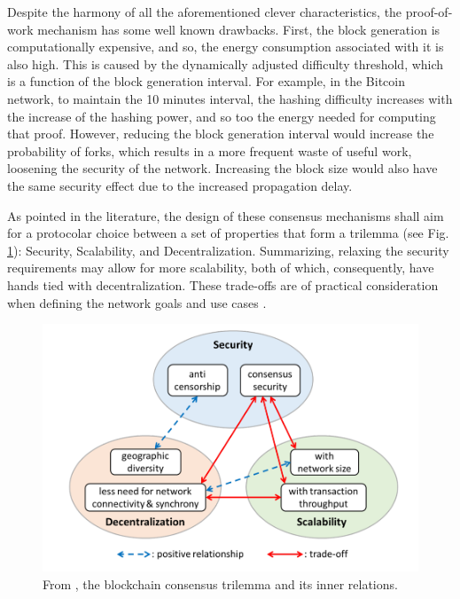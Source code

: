 \documentclass[journal]{IEEEtran}
\begin{document}
Despite the harmony of all the aforementioned clever characteristics,
the proof-of-work mechanism has some well known drawbacks. 
First, the block generation is computationally expensive, and so, the
energy consumption associated with it is also high. This is caused by the
dynamically adjusted difficulty threshold, which is a function of the block 
generation interval. For example, in the Bitcoin network, to maintain the 10 
minutes interval, the hashing difficulty
increases with the increase of the hashing power, and so too the energy needed for computing that proof. 
However, reducing the block generation interval would increase the
probability of forks, which results in a more frequent waste of useful work,
loosening the security of the network. Increasing the block size would also
have the same security effect due to the increased propagation delay.

As pointed in the literature, the design of these consensus mechanisms
shall aim for a protocolar choice between a set of properties that form a trilemma (see Fig. \ref{fig:trilemma}): 
Security, Scalability, and Decentralization.
Summarizing, relaxing the security requirements may allow for more scalability, both of which,
consequently, have hands tied with decentralization. These trade-offs are of practical
consideration when defining the network goals and use cases \cite{survey-dist-consensus}.

\begin{figure}[h]
  \centering
  \includegraphics[width=\columnwidth]{trilemma}
  \caption{From \cite{survey-dist-consensus}, the blockchain consensus trilemma and its inner relations.}
  \label{fig:trilemma}
\end{figure}
\end{document}
